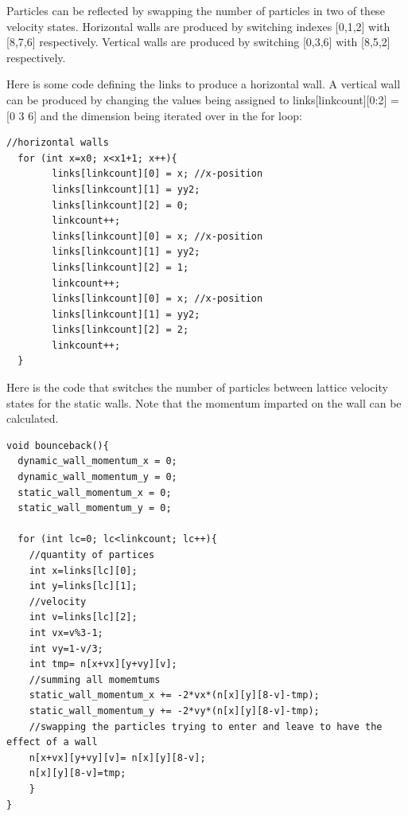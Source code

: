 \documentclass{article}
\begin{document}
Particles can be reflected by swapping the number of particles in two of these velocity states. Horizontal walls are produced by switching indexes [0,1,2] with [8,7,6] respectively. Vertical walls are produced by switching [0,3,6] with [8,5,2] respectively.

\vspace{5mm}
Here is some code defining the links to produce a horizontal wall. A vertical wall can be produced by changing the values being assigned to links[linkcount][0:2] = [0 3 6] and the dimension being iterated over in the for loop:\newline
\begin{verbatim}
//horizontal walls
  for (int x=x0; x<x1+1; x++){
    	links[linkcount][0] = x; //x-position
    	links[linkcount][1] = yy2;
    	links[linkcount][2] = 0;
    	linkcount++;
    	links[linkcount][0] = x; //x-position
    	links[linkcount][1] = yy2;
    	links[linkcount][2] = 1;
    	linkcount++;
    	links[linkcount][0] = x; //x-position 
    	links[linkcount][1] = yy2;
    	links[linkcount][2] = 2;
    	linkcount++;
  }
\end{verbatim}
\vspace{5mm}
Here is the code that switches the number of particles between lattice velocity states for the static walls. Note that the momentum imparted on the wall can be calculated.\newline
\begin{verbatim}
void bounceback(){
  dynamic_wall_momentum_x = 0;
  dynamic_wall_momentum_y = 0;
  static_wall_momentum_x = 0;
  static_wall_momentum_y = 0;
  
  for (int lc=0; lc<linkcount; lc++){
    //quantity of partices
    int x=links[lc][0];
    int y=links[lc][1];
    //velocity
    int v=links[lc][2];
    int vx=v%3-1;
    int vy=1-v/3;
    int tmp= n[x+vx][y+vy][v];
    //summing all momemtums
    static_wall_momentum_x += -2*vx*(n[x][y][8-v]-tmp);
    static_wall_momentum_y += -2*vy*(n[x][y][8-v]-tmp);
    //swapping the particles trying to enter and leave to have the effect of a wall
    n[x+vx][y+vy][v]= n[x][y][8-v];
    n[x][y][8-v]=tmp;		
	}
}
\end{verbatim}
\vspace{5mm}
\end{document}

